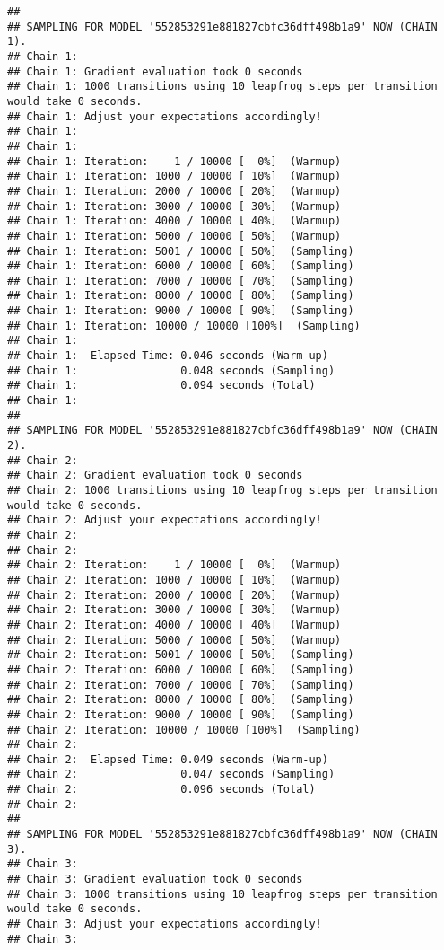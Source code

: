 \documentclass[
]{article}
\begin{document}
\begin{verbatim}
## 
## SAMPLING FOR MODEL '552853291e881827cbfc36dff498b1a9' NOW (CHAIN 1).
## Chain 1: 
## Chain 1: Gradient evaluation took 0 seconds
## Chain 1: 1000 transitions using 10 leapfrog steps per transition would take 0 seconds.
## Chain 1: Adjust your expectations accordingly!
## Chain 1: 
## Chain 1: 
## Chain 1: Iteration:    1 / 10000 [  0%]  (Warmup)
## Chain 1: Iteration: 1000 / 10000 [ 10%]  (Warmup)
## Chain 1: Iteration: 2000 / 10000 [ 20%]  (Warmup)
## Chain 1: Iteration: 3000 / 10000 [ 30%]  (Warmup)
## Chain 1: Iteration: 4000 / 10000 [ 40%]  (Warmup)
## Chain 1: Iteration: 5000 / 10000 [ 50%]  (Warmup)
## Chain 1: Iteration: 5001 / 10000 [ 50%]  (Sampling)
## Chain 1: Iteration: 6000 / 10000 [ 60%]  (Sampling)
## Chain 1: Iteration: 7000 / 10000 [ 70%]  (Sampling)
## Chain 1: Iteration: 8000 / 10000 [ 80%]  (Sampling)
## Chain 1: Iteration: 9000 / 10000 [ 90%]  (Sampling)
## Chain 1: Iteration: 10000 / 10000 [100%]  (Sampling)
## Chain 1: 
## Chain 1:  Elapsed Time: 0.046 seconds (Warm-up)
## Chain 1:                0.048 seconds (Sampling)
## Chain 1:                0.094 seconds (Total)
## Chain 1: 
## 
## SAMPLING FOR MODEL '552853291e881827cbfc36dff498b1a9' NOW (CHAIN 2).
## Chain 2: 
## Chain 2: Gradient evaluation took 0 seconds
## Chain 2: 1000 transitions using 10 leapfrog steps per transition would take 0 seconds.
## Chain 2: Adjust your expectations accordingly!
## Chain 2: 
## Chain 2: 
## Chain 2: Iteration:    1 / 10000 [  0%]  (Warmup)
## Chain 2: Iteration: 1000 / 10000 [ 10%]  (Warmup)
## Chain 2: Iteration: 2000 / 10000 [ 20%]  (Warmup)
## Chain 2: Iteration: 3000 / 10000 [ 30%]  (Warmup)
## Chain 2: Iteration: 4000 / 10000 [ 40%]  (Warmup)
## Chain 2: Iteration: 5000 / 10000 [ 50%]  (Warmup)
## Chain 2: Iteration: 5001 / 10000 [ 50%]  (Sampling)
## Chain 2: Iteration: 6000 / 10000 [ 60%]  (Sampling)
## Chain 2: Iteration: 7000 / 10000 [ 70%]  (Sampling)
## Chain 2: Iteration: 8000 / 10000 [ 80%]  (Sampling)
## Chain 2: Iteration: 9000 / 10000 [ 90%]  (Sampling)
## Chain 2: Iteration: 10000 / 10000 [100%]  (Sampling)
## Chain 2: 
## Chain 2:  Elapsed Time: 0.049 seconds (Warm-up)
## Chain 2:                0.047 seconds (Sampling)
## Chain 2:                0.096 seconds (Total)
## Chain 2: 
## 
## SAMPLING FOR MODEL '552853291e881827cbfc36dff498b1a9' NOW (CHAIN 3).
## Chain 3: 
## Chain 3: Gradient evaluation took 0 seconds
## Chain 3: 1000 transitions using 10 leapfrog steps per transition would take 0 seconds.
## Chain 3: Adjust your expectations accordingly!
## Chain 3: 

\end{verbatim}
\end{document}
